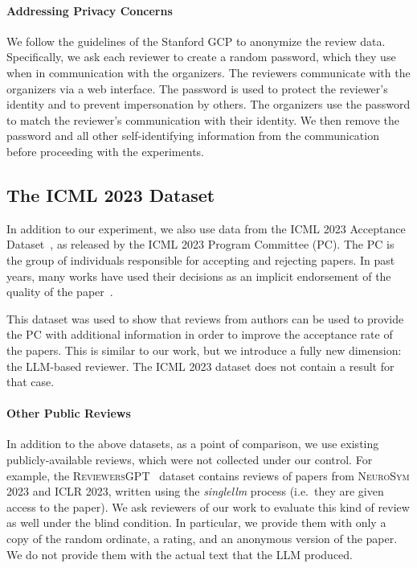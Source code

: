 \documentclass{article} %
\begin{document}
    \paragraph{Addressing Privacy Concerns}
    We follow the guidelines of the Stanford GCP to anonymize the review data. Specifically, we ask each reviewer to create a random password, which they use when in communication with the organizers. The reviewers communicate with the organizers via a web interface. The password is used to protect the reviewer's identity and to prevent impersonation by others. The organizers use the password to match the reviewer's communication with their identity. We then remove the password and all other self-identifying information from the communication before proceeding with the experiments.

\subsection{The \textsc{ICML 2023} Dataset}
In addition to our experiment, we also use data from the \textsc{ICML 2023} Acceptance Dataset~\citep{su2024analysis}, as released by the \textsc{ICML 2023} Program Committee (PC). The PC is the group of individuals responsible for accepting and rejecting papers. In past years, many works have used their decisions as an implicit endorsement of the quality of the paper~\cite{DBLP:journals/corr/abs-1903-11367, huang2023makes}. 

This dataset was used to show that reviews from authors can be used to provide the PC with additional information in order to improve the acceptance rate of the papers. This is similar to our work, but we introduce a fully new dimension: the LLM-based reviewer. The \textsc{ICML 2023} dataset does not contain a result for that case.
\paragraph{Other Public Reviews}
In addition to the above datasets, as a point of comparison, we use existing publicly-available reviews, which were not collected under our control. For example, the \textsc{ReviewersGPT}~\citep{liu2023reviewergpt} dataset contains reviews of papers from \textsc{NeuroSym 2023} and \textsc{ICLR 2023}, written using the \textit{singlellm} process (i.e.\ they are given access to the paper). We ask reviewers of our work to evaluate this kind of review as well under the blind condition. In particular, we provide them with only a copy of the random ordinate, a rating, and an anonymous version of the paper. We do not provide them with the actual text that the LLM produced. 
\end{document}
